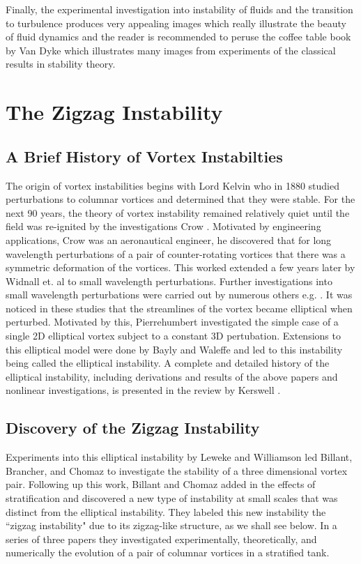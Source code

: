 Finally, the experimental investigation into instability of fluids and the transition to turbulence produces very appealing images which really illustrate the beauty of fluid dynamics and the reader is recommended to peruse the coffee table book by Van Dyke \cite{vandykealbum} which illustrates many images from experiments of the classical results in stability theory. 

\section{The Zigzag Instability}
\subsection{A Brief History of Vortex Instabilties}

The origin of vortex instabilities begins with Lord Kelvin who in 1880 studied perturbations to columnar vortices and determined that they were stable. For the next 90 years, the theory of vortex instability remained relatively quiet until the field was re-ignited by the investigations Crow \cite{crow1970}. Motivated by engineering applications, Crow was an aeronautical engineer, he discovered that for long wavelength perturbations of a pair of counter-rotating vortices that there was a symmetric deformation of the vortices. This worked extended a few years later by Widnall et. al \cite{widnall1974} to small wavelength perturbations. Further investigations into small wavelength perturbations were carried out by numerous others e.g. \cite{moore1975,tsai1976}. It was noticed in these studies that the streamlines of the vortex became elliptical when perturbed. Motivated by this, Pierrehumbert \cite{pierrehumbert1986} investigated the simple case of a single 2D elliptical vortex subject to a constant 3D pertubation. Extensions to this elliptical model were done by Bayly \cite{bayly1986} and Waleffe \cite{waleffe1990} and led to this instability being called the elliptical instability. A complete and detailed history of the elliptical instability, including derivations and results of the above papers and nonlinear investigations, is presented in the review by Kerswell \cite{kerswell2002}. 

\subsection{Discovery of the Zigzag Instability}
Experiments into this elliptical instability by Leweke and Williamson \cite{leweke1998} led Billant, Brancher, and Chomaz \cite{bc1999} to investigate the stability of a three dimensional vortex pair. Following up this work, Billant and Chomaz added in the effects of stratification and discovered a new type of instability at small scales that was distinct from the elliptical instability. They labeled this new instability the ``zigzag instability" due to its zigzag-like structure, as we shall see below. In a series of three papers they investigated experimentally\cite{bc2000a}, theoretically\cite{bc2000b}, and numerically \cite{bc2000c} the evolution of a pair of columnar vortices in a stratified tank.

